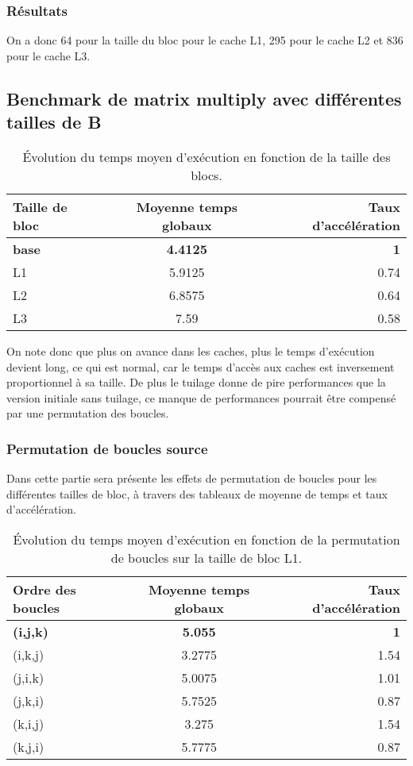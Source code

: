\documentclass{rapport}
\begin{document}
\subsubsection{Résultats}
On a donc 64 pour la taille du bloc pour le cache L1, 295 pour le cache L2 et 836 pour le cache L3.

\subsection{Benchmark de matrix multiply avec différentes tailles de B}
\begin{table}[H]
  \centering
  \begin{tabular}{ l|c|r }
    Taille de bloc & Moyenne temps globaux & Taux d'accélération \\
    \hline
    \textbf{base} & \textbf{ 4.4125 } & \textbf{1} \\
    L1 & 5.9125 & 0.74 \\
    L2 & 6.8575 & 0.64 \\
    L3 & 7.59 & 0.58 \\
  \end{tabular}
  \caption{Évolution du temps moyen d'exécution en fonction de la taille des blocs.}
\end{table}
On note donc que plus on avance dans les caches, plus le temps d'exécution devient long, ce qui est normal, car le temps d'accès aux caches est inversement proportionnel à sa taille. 
De plus le tuilage donne de pire performances que la version initiale sans tuilage, ce manque de performances pourrait être compensé par une permutation des boucles.

\subsubsection*{Permutation de boucles source}
Dans cette partie sera présente les effets de permutation de boucles pour les différentes tailles de bloc, à travers des tableaux de moyenne de temps et taux d'accélération.

\begin{table}[H]
  \centering
  \begin{tabular}{ l|c|r }
    Ordre des boucles & Moyenne temps globaux & Taux d'accélération \\
    \hline
    \textbf{(i,j,k)} & \textbf{ 5.055 } & \textbf{1} \\
    (i,k,j) & 3.2775 & 1.54 \\
    (j,i,k) & 5.0075 & 1.01 \\
    (j,k,i) & 5.7525 & 0.87 \\
    (k,i,j) & 3.275 & 1.54 \\
    (k,j,i) & 5.7775 & 0.87 \\
  \end{tabular}
  \label{Tableau 1}
  \caption{Évolution du temps moyen d'exécution en fonction de la permutation de boucles sur la taille de bloc L1.}
\end{table}
\end{document}

